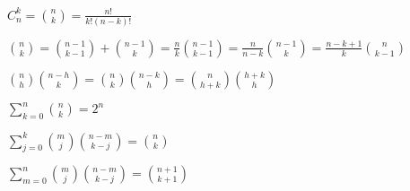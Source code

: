 $C_n^k=\binom{n}{k}=\frac{n!}{k!(n-k)!}$

$\binom{n}{k}=\binom{n-1}{k-1}+\binom{n-1}{k}=\frac{n}{k}\binom{n-1}{k-1}=\frac{n}{n-k}\binom{n-1}{k}=\frac{n-k+1}{k}\binom{n}{k-1}$

$\binom{n}{h}\binom{n-h}{k}=\binom{n}{k}\binom{n-k}{h}=\binom{n}{h+k}\binom{h+k}{h}$

$\sum\limits_{k=0}^n\binom{n}{k}=2^n$

$\sum\limits_{j=0}^k\binom{m}{j}\binom{n-m}{k-j}=\binom{n}{k}$

$\sum\limits_{m=0}^n\binom{m}{j}\binom{n-m}{k-j}=\binom{n+1}{k+1}$
